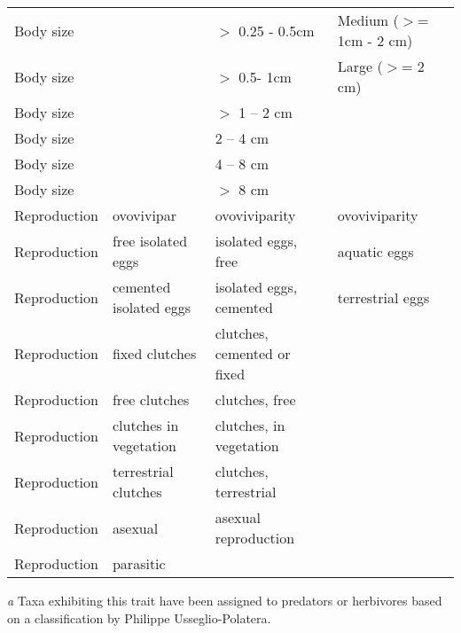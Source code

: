 \documentclass[../Draft_harmonization_paper.tex]{subfiles}
\begin{document}
\begin{longtable}{lll|l}
    Body size &  & $>$ 0.25 - 0.5cm & Medium ($>$= 1cm - 2 cm) \\ 
    Body size &  & $>$ 0.5- 1cm & Large ($>$= 2 cm) \\ 
    Body size &  & $>$ 1 – 2 cm &  \\ 
    Body size &  & 2 – 4 cm &  \\ 
    Body size &  & 4 – 8 cm &  \\ 
    Body size &  & $>$ 8 cm &  \\ 
    \hline
    Reproduction & ovovivipar & ovoviviparity & ovoviviparity \\ 
    \rowcolor{purple!25}
    Reproduction & free isolated eggs & isolated eggs, free & aquatic eggs \\ 
    \cellcolor{purple!25}Reproduction & \cellcolor{purple!25}cemented isolated eggs & \cellcolor{purple!25}isolated eggs, cemented & terrestrial eggs \\
    \cellcolor{purple!25}Reproduction & \cellcolor{purple!25}fixed clutches & \cellcolor{purple!25}clutches, cemented or fixed &  \\ 
    \cellcolor{purple!25}Reproduction & \cellcolor{purple!25}free clutches & \cellcolor{purple!25}clutches, free &  \\ 
    \cellcolor{purple!25}Reproduction & \cellcolor{purple!25}clutches in vegetation & \cellcolor{purple!25}clutches, in vegetation &  \\ 
    Reproduction & terrestrial clutches & clutches, terrestrial &  \\ 
    \color{cyan}Reproduction & \color{cyan}asexual & \color{cyan}asexual reproduction &  \\ 
    \color{cyan}Reproduction & \color{cyan}parasitic &  &  \\ 
    \hline
\end{longtable}
\begin{minipage}{\linewidth}\small
    \textit{a} Taxa exhibiting this trait have been assigned to predators or herbivores based on a classification by Philippe Usseglio-Polatera.
\end{minipage}

\end{document}
